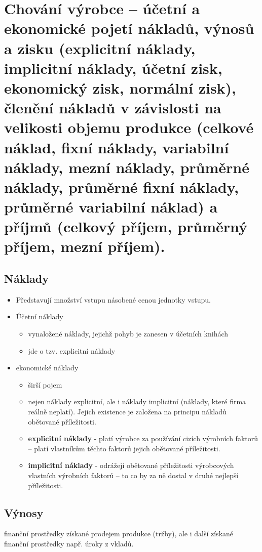 \clearpage
\section{Chování výrobce – účetní a ekonomické pojetí nákladů, výnosů a zisku (explicitní
náklady, implicitní náklady, účetní zisk, ekonomický zisk, normální zisk), členění
nákladů v závislosti na velikosti objemu produkce (celkové náklad, fixní náklady,
variabilní náklady, mezní náklady, průměrné náklady, průměrné fixní náklady,
průměrné variabilní náklad) a příjmů (celkový příjem, průměrný příjem, mezní příjem).}

\subsection{Náklady}
\begin{itemize}
    \item Představují množství vstupu násobené cenou jednotky vstupu.
    \item Účetní náklady
    \begin{itemize}
        \item vynaložené náklady, jejichž pohyb je zanesen v účetních knihách
        \item jde o tzv. explicitní náklady
    \end{itemize}
    \item ekonomické náklady
    \begin{itemize}
        \item širší pojem
        \item nejen náklady explicitní, ale i náklady implicitní (náklady, 
        které firma reálně neplatí). Jejich existence je založena na principu 
        nákladů obětované příležitosti.
        \item \textbf{explicitní náklady} - platí výrobce za používání cizích výrobních 
        faktorů – platí vlastníkům těchto faktorů jejich obětované příležitosti.
        \item \textbf{implicitní náklady} - odrážejí obětované příležitosti výrobcových 
        vlastních výrobních faktorů – to co by za ně dostal v druhé nejlepší příležitosti.
    \end{itemize}
\end{itemize}

\subsection{Výnosy}
finanční prostředky získané prodejem produkce (tržby), ale i další získané finanční 
prostředky např. úroky z vkladů.

